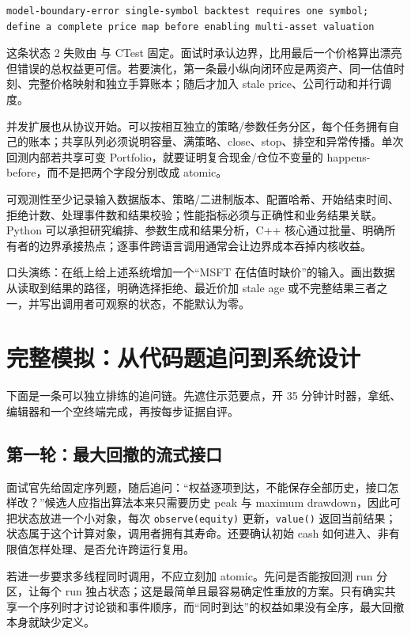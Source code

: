 \begin{lstlisting}[numbers=none]
model-boundary-error single-symbol backtest requires one symbol; define a complete price map before enabling multi-asset valuation
\end{lstlisting}

这条状态 2 失败由  与 CTest 固定。面试时承认边界，比用最后一个价格算出漂亮但错误的总权益更可信。若要演化，第一条最小纵向闭环应是两资产、同一估值时刻、完整价格映射和独立手算账本；随后才加入 stale price、公司行动和并行调度。

并发扩展也从协议开始。可以按相互独立的策略/参数任务分区，每个任务拥有自己的账本；共享队列必须说明容量、满策略、close、stop、排空和异常传播。单次回测内部若共享可变 Portfolio，就要证明复合现金/仓位不变量的 happens-before，而不是把两个字段分别改成 atomic。

可观测性至少记录输入数据版本、策略/二进制版本、配置哈希、开始结束时间、拒绝计数、处理事件数和结果校验；性能指标必须与正确性和业务结果关联。Python 可以承担研究编排、参数生成和结果分析，C++ 核心通过批量、明确所有者的边界承接热点；逐事件跨语言调用通常会让边界成本吞掉内核收益。

口头演练：在纸上给上述系统增加一个“MSFT 在估值时缺价”的输入。画出数据从读取到结果的路径，明确选择拒绝、最近价加 stale age 或不完整结果三者之一，并写出调用者可观察的状态，不能默认为零。

\section{完整模拟：从代码题追问到系统设计}

下面是一条可以独立排练的追问链。先遮住示范要点，开 35 分钟计时器，拿纸、编辑器和一个空终端完成，再按每步证据自评。

\subsection{第一轮：最大回撤的流式接口}

面试官先给固定序列题，随后追问：“权益逐项到达，不能保存全部历史，接口怎样改？”候选人应指出算法本来只需要历史 peak 与 maximum drawdown，因此可把状态放进一个小对象，每次 \texttt{observe(equity)} 更新，\texttt{value()} 返回当前结果；状态属于这个计算对象，调用者拥有其寿命。还要确认初始 cash 如何进入、非有限值怎样处理、是否允许跨运行复用。

若进一步要求多线程同时调用，不应立刻加 atomic。先问是否能按回测 run 分区，让每个 run 独占状态；这是最简单且最容易确定性重放的方案。只有确实共享一个序列时才讨论锁和事件顺序，而“同时到达”的权益如果没有全序，最大回撤本身就缺少定义。

